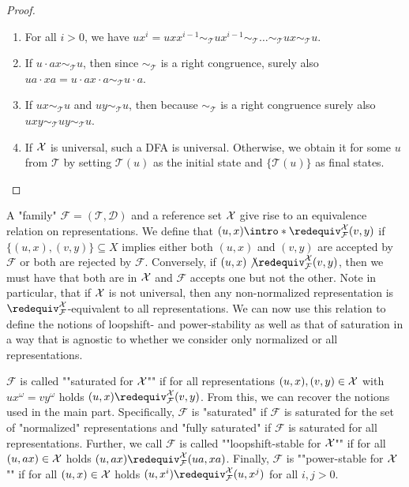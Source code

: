 \documentclass[a4paper,USenglish,cleveref,autoref,thm-restate]{lipics-v2021}
\newcommand{\mc}[1]{\ensuremath{\mathcal{#1}}}
\newcommand{\T}{\mc{T}}
\newcommand{\F}{\mc{F}}
\newcommand{\D}{\mc{D}}
\begin{document}
{\begin{proof}
\begin{enumerate}
        Because $\D_u = \D_{\T(u)}$ and $\sim_\T$ is a right congruence, we obtain $u\D_{\T(u)}(x) \sim_\T \T(u)\D_{\T(u)}(x) \sim_\T u\D_u(x) \sim_\T ux$, from which the equivalence immediately follows.
        \item
        For all $i > 0$, we have $ux^i = uxx^{i-1} \sim_\T ux^{i-1} \sim_\T \dots \sim_\T ux \sim_\T u$.
        \item 
        If $u\cdot ax \sim_\T u$, then since $\sim_\T$ is a right congruence, surely also $ua \cdot xa = u \cdot ax \cdot a \sim_\T u\cdot a$.
        \item 
        If $ux\sim_\T u$ and $uy\sim_\T u$, then because $\sim_\T$ is a right congruence surely also $uxy\sim_\T uy \sim_\T u$.
        \item
        If $\mathcal{X}$ is universal, such a DFA is universal.
        Otherwise, we obtain it for some $u$ from $\T$ by setting $\T(u)$ as the initial state and $\{\T(u)\}$ as final states.
    \end{enumerate}
\end{proof}

A "family" $\F = (\T, \D)$ and a reference set $\mathcal{X}$ give rise to an equivalence relation on representations.
We define that $(u,x) \intro*\redequiv^\X_\F (v,y)$ if $\{(u,x),(v,y)\} \subseteq X$ implies either both $(u,x)$ and $(v,y)$ are accepted by $\F$ or both are rejected by $\F$.
Conversely, if $(u,x) \not\redequiv^\X_\F (v,y)$, then we must have that both are in $\mathcal{X}$ and $\F$ accepts one but not the other.
Note in particular, that if $\mathcal{X}$ is not universal, then any non-normalized representation is $\redequiv^\X_\F$-equivalent to all representations.
We can now use this relation to define the notions of loopshift- and power-stability as well as that of saturation in a way that is agnostic to whether we consider only normalized or all representations.

\AP
$\F$ is called ""saturated for $\mathcal{X}$"" if for all representations $(u,x),(v,y) \in \mathcal{X}$ with $ux^\omega = vy^\omega$ holds $(u,x) \redequiv^\X_\F (v,y)$.
From this, we can recover the notions used in the main part.
Specifically, $\F$ is "saturated" if $\F$ is saturated for the set of "normalized" representations and "fully saturated" if $\F$ is saturated for all representations.
\AP
Further, we call $\F$ is called ""loopshift-stable for $\mathcal{X}$"" if for all $(u,ax) \in \mathcal{X}$ holds $(u, ax) \redequiv^\X_\F (ua, xa)$.
Finally, $\F$ is ""power-stable for $\mathcal{X}$"" if for all $(u,x) \in \mathcal{X}$ holds $(u,x^i) \redequiv^\X_\F (u,x^j)$ for all $i, j > 0$.

}
\end{document}
